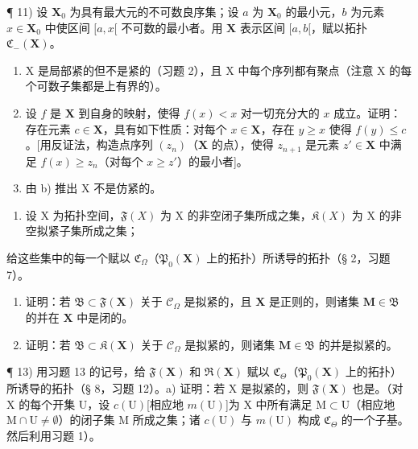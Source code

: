 ¶ 11) 设 \(\mathbf{X}_0\) 为具有最大元的不可数良序集；设 \(a\) 为 \(\mathbf{X}_0\) 的最小元，\(b\) 为元素 \(x \in \mathbf{X}_0\) 中使区间 \([a, x[\) 不可数的最小者。用 \(\mathbf{X}\) 表示区间 \([a, b[\)，赋以拓扑 \(\mathfrak{C}_{-}(\mathbf{X})\)。

\begin{enumerate}
\def\labelenumi{\alph{enumi})}
\item
  X 是局部紧的但不是紧的（习题 2），且 X 中每个序列都有聚点（注意 X 的每个可数子集都是上有界的）。
\item
  设 \(f\) 是 \(\mathbf{X}\) 到自身的映射，使得 \(f(x) < x\) 对一切充分大的 \(x\) 成立。证明：存在元素 \(c \in \mathbf{X}\)，具有如下性质：对每个 \(x \in \mathbf{X}\)，存在 \(y \geqslant x\) 使得 \(f(y) \leqslant c\)。{[}用反证法，构造点序列 \((z_n)\)（\(\mathbf{X}\) 的点），使得 \(z_{n+1}\) 是元素 \(z' \in \mathbf{X}\) 中满足 \(f(x) \geqslant z_n\)（对每个 \(x \geqslant z'\)）的最小者{]}。
\item
  由 b) 推出 X 不是仿紧的。
\end{enumerate}

\begin{enumerate}
\def\labelenumi{\arabic{enumi})}
\setcounter{enumi}{11}
\tightlist
\item
  设 X 为拓扑空间，\(\mathfrak{F}(X)\) 为 X 的非空闭子集所成之集，\(\mathfrak{K}(X)\) 为 X 的非空拟紧子集所成之集；
\end{enumerate}

给这些集中的每一个赋以 \(\mathfrak{C}_{\Omega}\)（\(\mathfrak{P}_{0}(\mathbf{X})\) 上的拓扑）所诱导的拓扑（§ 2，习题 7）。

\begin{enumerate}
\def\labelenumi{\alph{enumi})}
\tightlist
\item
  证明：若 \(\mathfrak{B} \subset \mathfrak{F}(\mathbf{X})\) 关于 \(\mathcal{C}_{\Omega}\) 是拟紧的，且 \(\mathbf{X}\) 是正则的，则诸集 \(\mathbf{M} \in \mathfrak{B}\) 的并在 \(\mathbf{X}\) 中是闭的。\\
\item
  证明：若 \(\mathfrak{B} \subset \mathfrak{K}(\mathbf{X})\) 关于 \(\mathcal{C}_{\Omega}\) 是拟紧的，则诸集 \(\mathbf{M} \in \mathfrak{B}\) 的并是拟紧的。
\end{enumerate}

¶ 13) 用习题 13 的记号，给 \(\mathfrak{F}(\mathbf{X})\) 和 \(\mathfrak{R}(\mathbf{X})\) 赋以 \(\mathfrak{C}_{\Theta}\)（\(\mathfrak{P}_{0}(\mathbf{X})\) 上的拓扑）所诱导的拓扑（§ 8，习题 12）。a) 证明：若 X 是拟紧的，则 \(\mathfrak{F}(\mathbf{X})\) 也是。（对 X 的每个开集 U，设 \(c(\mathrm{U})\){[}相应地 \(m(\mathrm{U})\){]}为 X 中所有满足 \(\mathrm{M} \subset \mathrm{U}\)（相应地 \(\mathrm{M} \cap \mathrm{U} \neq \emptyset\)）的闭子集 M 所成之集；诸 \(c(\mathrm{U})\) 与 \(m(\mathrm{U})\) 构成 \(\mathfrak{C}_{\Theta}\) 的一个子基。然后利用习题 1）。

